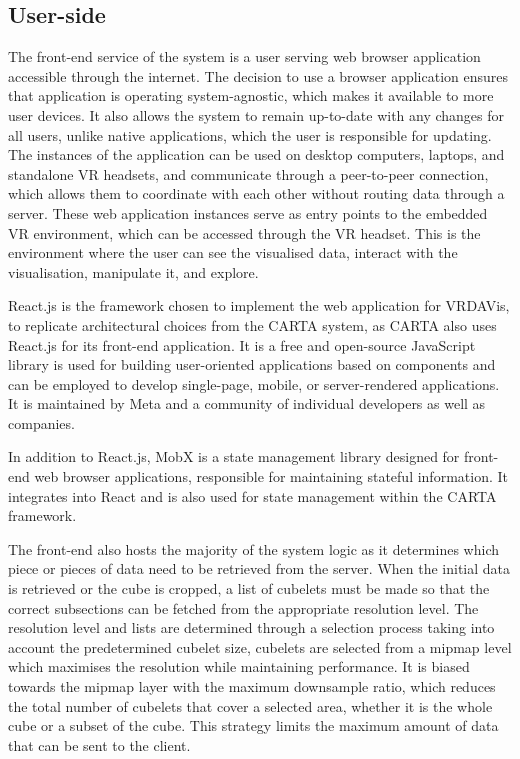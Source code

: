 \subsection{User-side}
\label{sec:user-side}
The front-end service of the system is a user serving web browser application accessible through the internet. 
The decision to use a browser application ensures that application is operating system-agnostic, which makes it available to more user devices. 
It also allows the system to remain up-to-date with any changes for all users, unlike native applications, which the user is responsible for updating. 
The instances of the application can be used on desktop computers, laptops, and standalone VR headsets, and communicate through a peer-to-peer connection, which allows them to coordinate with each other without routing data through a server. 
These web application instances serve as entry points to the embedded VR environment, which can be accessed through the VR headset. 
This is the environment where the user can see the visualised data, interact with the visualisation, manipulate it, and explore.

React.js is the framework chosen to implement the web application for VRDAVis, to replicate architectural choices from the CARTA system, as CARTA also uses React.js for its front-end application.
It is a free and open-source JavaScript library is used for building user-oriented applications based on components and can be employed to develop single-page, mobile, or server-rendered applications. 
It is maintained by Meta and a community of individual developers as well as companies.

In addition to React.js, MobX is a state management library designed for front-end web browser applications, responsible for maintaining stateful information. 
It integrates into React and is also used for state management within the CARTA framework.


The front-end also hosts the majority of the system logic as it determines which piece or pieces of data need to be retrieved from the server. 
When the initial data is retrieved or the cube is cropped, a list of cubelets must be made so that the correct subsections can be fetched from the appropriate resolution level. 
The resolution level and lists are determined through a selection process taking into account the predetermined cubelet size, cubelets are selected from a mipmap level which maximises the resolution while maintaining performance. 
It is biased towards the mipmap layer with the maximum downsample ratio, which reduces the total number of cubelets that cover a selected area, whether it is the whole cube or a subset of the cube. 
This strategy limits the maximum amount of data that can be sent to the client. 

